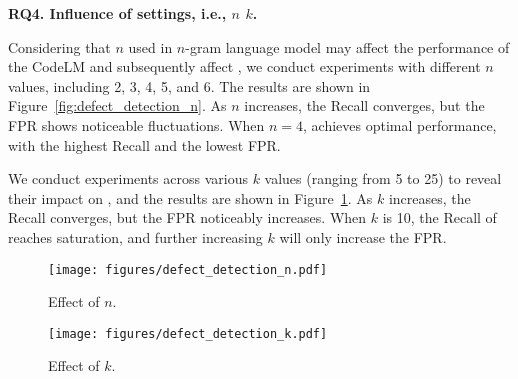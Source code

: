 \noindent\textbf{RQ4. Influence of settings, i.e., $n$\revise{,} $k$.}



Considering that $n$ used in $n$-gram language model may affect the performance of the CodeLM and subsequently affect \ours{}, we conduct experiments with different $n$ values, including 2, 3, 4, 5, and 6. The results are shown in Figure~\ref{fig:defect_detection_n}.  
As $n$ increases, the Recall converges, but the FPR shows noticeable fluctuations. 
When $n = 4$, \ours{} achieves optimal performance, with the highest Recall and the lowest FPR.


We conduct experiments across various $k$ values (ranging from 5 to 25) to reveal their impact on \ours{}, and the results are shown in Figure~\ref{fig:defect_detection_k}.
As $k$ increases, the Recall converges, but the FPR noticeably increases. 
When $k$ is 10, the Recall of \ours{} reaches saturation, and further increasing $k$ will only increase the FPR. 

\begin{figure}[!t]
    \centering
    \begin{minipage}[t]{0.475\linewidth}
        \centering
        \texttt{[image: figures/defect\_detection\_n.pdf]}
        \vspace{-4mm}
        \caption{Effect of $n$.}
    \label{fig:defect_detection_n}
    \end{minipage}
    \hspace{1mm}
    \begin{minipage}[t]{0.475\linewidth}
        \centering
        \texttt{[image: figures/defect\_detection\_k.pdf]}
        \vspace{-4mm}
        \caption{Effect of $k$.}
        \label{fig:defect_detection_k}
    \end{minipage}
    \vspace{-2mm}
\end{figure}





